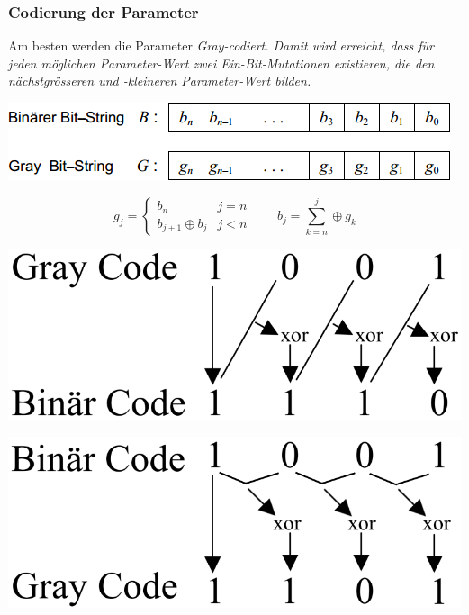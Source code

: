     \subsubsection{Codierung der Parameter }
      Am besten werden die Parameter \em Gray\em -codiert. Damit wird erreicht, dass für jeden möglichen Parameter-Wert zwei Ein-Bit-Mutationen existieren, die den nächstgrösseren und -kleineren Parameter-Wert bilden.
      
      \begin{minipage}{0.33\textwidth}
      	\begin{center}
  	        \includegraphics[width=\textwidth]{./Content/MetaHeuristics/GeneticAlgorithms_Gray}
  	      \end{center}
  	      $$g_j = \begin{cases}
  	        b_n                & j=n\\
  	        b_{j+1} \oplus b_j & j < n
  	        \end{cases} \qquad 
  	      b_j = \sum \limits_{k=n}^j \oplus g_k$$
      	\end{minipage}
      	\hfill
      	\begin{minipage}{0.3\textwidth}
            \includegraphics[width=\textwidth]{./Content/MetaHeuristics/binGray}	
    	\end{minipage}
    	\hfill
    	\begin{minipage}{0.3\textwidth}
            \includegraphics[width=\textwidth]{./Content/MetaHeuristics/grayBin}    	
    	\end{minipage}
  
